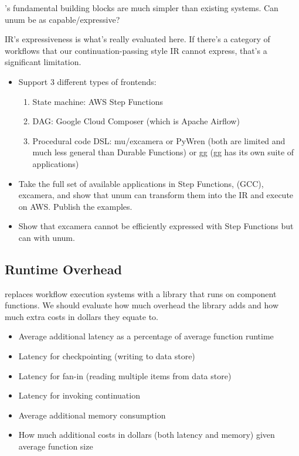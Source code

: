 \name{}'s fundamental building blocks are much simpler than existing
systems. Can unum be as capable/expressive?

\name{} IR's expressiveness is what's really evaluated here. If there's a
category of workflows that our continuation-passing style IR cannot express,
that's a significant limitation.

\begin{itemize}

	\item Support 3 different types of frontends:

	\begin{enumerate}
		\item State machine: AWS Step Functions
		\item DAG: Google Cloud Composer (which is Apache Airflow)
		\item Procedural code DSL: mu/excamera or PyWren (both are limited and
		much less general than Durable Functions) or gg (gg has its own suite
		of applications)
	\end{enumerate}

	\item Take the full set of available applications in Step Functions,
(GCC), excamera, and show that unum can transform them into the IR and execute
on AWS. Publish the examples.

	\item Show that excamera cannot be efficiently expressed with Step
	Functions but can with unum.

\end{itemize}


\subsection{Runtime Overhead}

\name{} replaces workflow execution systems with a library that runs on
component functions. We should evaluate how much overhead the \name{} library
adds and how much extra costs in dollars they equate to.

\begin{itemize}
	\item Average additional latency as a percentage of average function
	runtime
	\item Latency for checkpointing (writing to data store)
	\item Latency for fan-in (reading multiple items from data store)
	\item Latency for invoking continuation
	\item Average additional memory consumption
	\item How much additional costs in dollars (both latency and memory) given
	average function size
\end{itemize}


